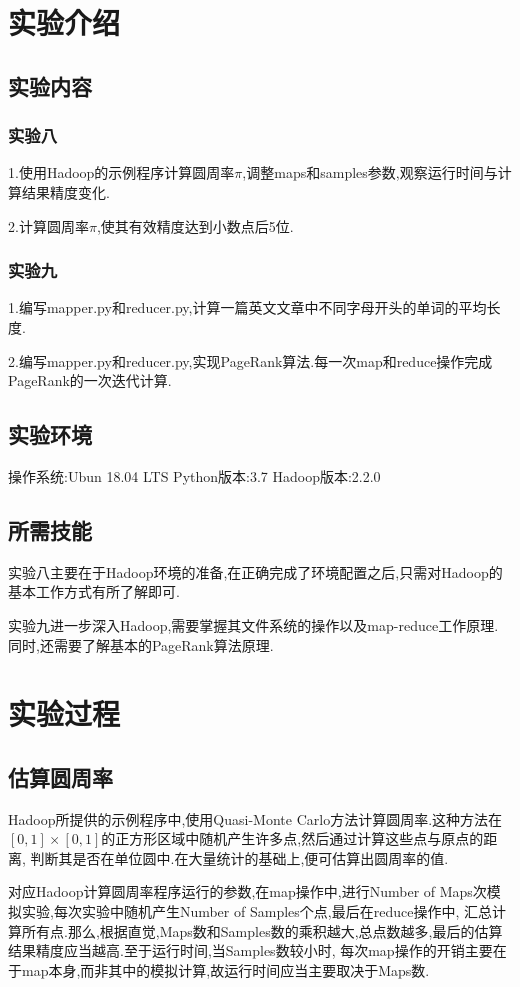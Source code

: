 \documentclass[a4paper]{article}
\begin{document}
    \tableofcontents
    \newpage
    \section{实验介绍}
        \subsection{实验内容}
            \subsubsection{实验八}
1.使用Hadoop的示例程序计算圆周率$\pi$,调整maps和samples参数,观察运行时间与计算结果精度变化.

2.计算圆周率$\pi$,使其有效精度达到小数点后5位.
            \subsubsection{实验九}
1.编写mapper.py和reducer.py,计算一篇英文文章中不同字母开头的单词的平均长度.

2.编写mapper.py和reducer.py,实现PageRank算法.每一次map和reduce操作完成PageRank的一次迭代计算.
        \subsection{实验环境}
操作系统:Ubun 18.04 LTS
Python版本:3.7
Hadoop版本:2.2.0
        \subsection{所需技能}
实验八主要在于Hadoop环境的准备,在正确完成了环境配置之后,只需对Hadoop的基本工作方式有所了解即可.

实验九进一步深入Hadoop,需要掌握其文件系统的操作以及map-reduce工作原理.同时,还需要了解基本的PageRank算法原理.
\newpage
    \section{实验过程}
        \subsection{估算圆周率}
Hadoop所提供的示例程序中,使用Quasi-Monte Carlo方法计算圆周率.这种方法在$[0,1]\times[0,1]$的正方形区域中随机产生许多点,然后通过计算这些点与原点的距离,
判断其是否在单位圆中.在大量统计的基础上,便可估算出圆周率的值.

对应Hadoop计算圆周率程序运行的参数,在map操作中,进行Number of Maps次模拟实验,每次实验中随机产生Number of Samples个点,最后在reduce操作中,
汇总计算所有点.那么,根据直觉,Maps数和Samples数的乘积越大,总点数越多,最后的估算结果精度应当越高.至于运行时间,当Samples数较小时,
每次map操作的开销主要在于map本身,而非其中的模拟计算,故运行时间应当主要取决于Maps数.
\end{document}
